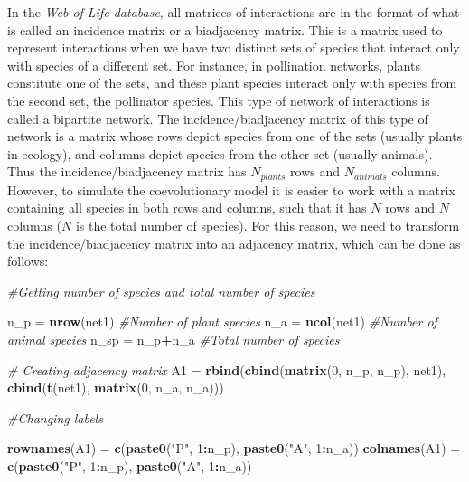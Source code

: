 \documentclass[
]{book}
\newenvironment{Shaded}{\begin{snugshade}}{\end{snugshade}}
\newcommand{\CommentTok}[1]{\textcolor[rgb]{0.56,0.35,0.01}{\textit{#1}}}
\newcommand{\DecValTok}[1]{\textcolor[rgb]{0.00,0.00,0.81}{#1}}
\newcommand{\FunctionTok}[1]{\textcolor[rgb]{0.13,0.29,0.53}{\textbf{#1}}}
\newcommand{\NormalTok}[1]{#1}
\newcommand{\OtherTok}[1]{\textcolor[rgb]{0.56,0.35,0.01}{#1}}
\newcommand{\SpecialCharTok}[1]{\textcolor[rgb]{0.81,0.36,0.00}{\textbf{#1}}}
\newcommand{\StringTok}[1]{\textcolor[rgb]{0.31,0.60,0.02}{#1}}
\begin{document}
In the \emph{Web-of-Life database}, all matrices of interactions are in the format of what is called an incidence matrix or a biadjacency matrix. This is a matrix used to represent interactions when we have two distinct sets of species that interact only with species of a different set. For instance, in pollination networks, plants constitute one of the sets, and these plant species interact only with species from the second set, the pollinator species. This type of network of interactions is called a bipartite network. The incidence/biadjacency matrix of this type of network is a matrix whose rows depict species from one of the sets (usually plants in ecology), and columns depict species from the other set (usually animals). Thus the incidence/biadjacency matrix has \(N_{plants}\) rows and \(N_{animals}\) columns. However, to simulate the coevolutionary model it is easier to work with a matrix containing all species in both rows and columns, such that it has \(N\) rows and \(N\) columns (\(N\) is the total number of species). For this reason, we need to transform the incidence/biadjacency matrix into an adjacency matrix, which can be done as follows:

\begin{Shaded}
\begin{Highlighting}[]
\CommentTok{\#Getting number of species and total number of species}

\NormalTok{n\_p }\OtherTok{=} \FunctionTok{nrow}\NormalTok{(net1) }\CommentTok{\#Number of plant species}
\NormalTok{n\_a }\OtherTok{=} \FunctionTok{ncol}\NormalTok{(net1) }\CommentTok{\#Number of animal species}
\NormalTok{n\_sp }\OtherTok{=}\NormalTok{ n\_p}\SpecialCharTok{+}\NormalTok{n\_a }\CommentTok{\#Total number of species}

\CommentTok{\# Creating adjacency matrix}
\NormalTok{A1 }\OtherTok{=} \FunctionTok{rbind}\NormalTok{(}\FunctionTok{cbind}\NormalTok{(}\FunctionTok{matrix}\NormalTok{(}\DecValTok{0}\NormalTok{, n\_p, n\_p), net1), }\FunctionTok{cbind}\NormalTok{(}\FunctionTok{t}\NormalTok{(net1), }\FunctionTok{matrix}\NormalTok{(}\DecValTok{0}\NormalTok{, n\_a, n\_a)))}

\CommentTok{\#Changing labels}

\FunctionTok{rownames}\NormalTok{(A1) }\OtherTok{=} \FunctionTok{c}\NormalTok{(}\FunctionTok{paste0}\NormalTok{(}\StringTok{"P"}\NormalTok{, }\DecValTok{1}\SpecialCharTok{:}\NormalTok{n\_p), }\FunctionTok{paste0}\NormalTok{(}\StringTok{"A"}\NormalTok{, }\DecValTok{1}\SpecialCharTok{:}\NormalTok{n\_a))}
\FunctionTok{colnames}\NormalTok{(A1) }\OtherTok{=} \FunctionTok{c}\NormalTok{(}\FunctionTok{paste0}\NormalTok{(}\StringTok{"P"}\NormalTok{, }\DecValTok{1}\SpecialCharTok{:}\NormalTok{n\_p), }\FunctionTok{paste0}\NormalTok{(}\StringTok{"A"}\NormalTok{, }\DecValTok{1}\SpecialCharTok{:}\NormalTok{n\_a))}
\end{Highlighting}
\end{Shaded}
\end{document}
